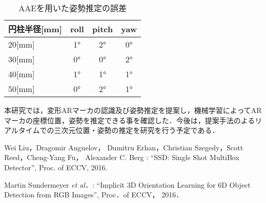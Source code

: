 \documentclass{jsarticle}
\begin{document}
\begin{table}[h]
        \vspace{-1.8zh}
          \begin{center}
            \caption{AAEを用いた姿勢推定の誤差}
            \label{hyouka}
            \begin{tabular}{l|c|c|c} \hline
              円柱半径[mm]   & roll& pitch & yaw \\ \hline
 20[mm]  & 1° & 2° & 0° \\ \hline
              30[mm]  & 0° & 0° & 2° \\ \hline
              40[mm]  & 1° & 1° & 1° \\ \hline
              50[mm]  & 0°& 2° & 1° \\ \hline
              \end{tabular}
          \end{center}
        \vspace{-1.0zh}
\end{table}





本研究では，変形ARマーカの認識及び姿勢推定を提案し，機械学習によってARマーカの座標位置，姿勢を推定できる事を確認した．今後は，提案手法のよるリアルタイムでの三次元位置・姿勢の推定を研究を行う予定である．

%
%
%

\begin{thebibliography}{1}
{\scriptsize 
{}
Wei Liu，Dragomir Anguelov， Dumitru Erhan，Christian Szegedy，Scott Reed，Cheng-Yang Fu， Alexander C. Berg : ``SSD: Single Shot MultiBox Detector'', Proc. of ECCV, 2016.}

{\scriptsize 
{}
Martin Sundermeyer {\em et al．}: ``Implicit 3D Orientation Learning for 6D Object Detection from RGB Images'', 
Proc．of ECCV， 2016．}

\end{thebibliography}
\end{document}
